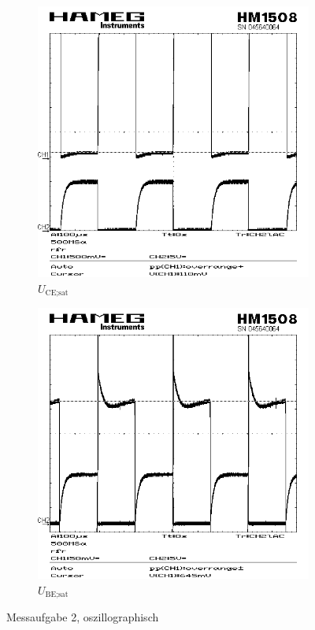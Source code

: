 \documentclass[numbers=noenddot,10pt,a4paper]{scrartcl}
\newcommand{\indx}[1]{_\text{#1}}
\begin{document}
\begin{figure}[H]
\centering
\begin{subfigure}[b]{0.4\textwidth}
\includegraphics[width=\textwidth]{SCR00001.png}
\caption{$U\indx{CE;sat}$}
\end{subfigure}
\begin{subfigure}[b]{0.4\textwidth}
\includegraphics[width=\textwidth]{SCR00002.png}
\caption{$U\indx{BE;sat}$}
\end{subfigure}
\caption{Messaufgabe 2, oszillographisch}
\end{figure}
\end{document}
